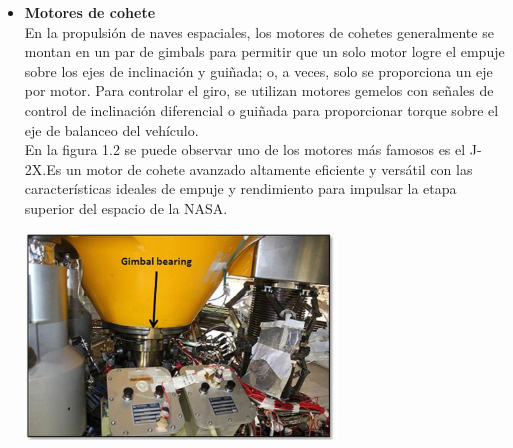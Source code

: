 \begin{itemize}
	\item \textbf{Motores de cohete}\\
	      En la propulsión de naves espaciales, los motores de cohetes generalmente se
	      montan en un par de gimbals para permitir que un solo motor logre el empuje
	      sobre los ejes de inclinación y guiñada; o, a veces, solo se proporciona un eje
	      por motor. Para controlar el giro, se utilizan motores gemelos con señales de
	      control de inclinación diferencial o guiñada para proporcionar torque sobre el
	      eje de balanceo del vehículo.\\
	      En la figura 1.2 se puede observar uno de los motores más famosos es el J-2X.Es un motor de cohete avanzado altamente
	      eficiente y versátil con las características ideales de empuje y rendimiento para
	      impulsar la etapa superior del espacio de la NASA.\cite{WEB:NASA}
	      \begin{center}
		      \includegraphics[width=0.65\textwidth]{Contenido/Cuerpo/Capitulo1/Fig2.eps}
		      \label{fig:Introduccion:Fig3}
	      \end{center}


\end{itemize}
